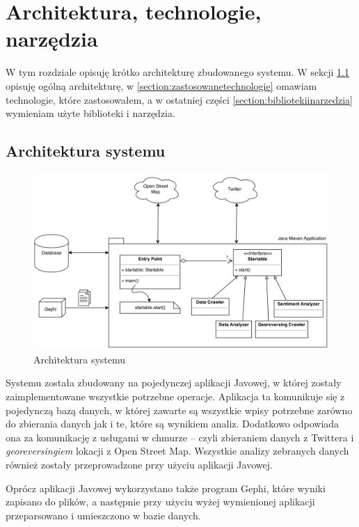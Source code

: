 \chapter{Architektura, technologie, narzędzia}
\label{chapter:architektura}
W tym rozdziale opisuję krótko architekturę zbudowanego systemu.
W sekcji \ref{section:architekturasystemu} opisuję ogólną architekturę,
w \ref{section:zastosowanetechnologie} omawiam technologie, które zastosowałem,
a w ostatniej części \ref{section:bibliotekiinarzedzia} wymieniam użyte
biblioteki i narzędzia.
\section{Architektura systemu}
\label{section:architekturasystemu}

\begin{figure}[ht!]
\centering
\includegraphics[width=160mm]{img/architektura.png}
\caption{Architektura systemu}
\label{image:architektura-systemu}
\end{figure}
Systemu została zbudowany na pojedynczej aplikacji Javowej,
w której zostały zaimplementowane wszystkie potrzebne operacje.
Aplikacja ta komunikuje się z pojedynczą bazą danych, w której zawarte
są wszystkie wpisy potrzebne zarówno do zbierania danych jak i te, które są
wynikiem analiz. Dodatkowo odpowiada ona za komunikację z usługami w chmurze --
czyli zbieraniem danych z Twittera i \textit{georeversingiem} lokacji z Open
Street Map. Wszystkie analizy zebranych danych również zostały przeprowadzone
przy użyciu aplikacji Javowej.

Oprócz aplikacji Javowej wykorzystano także program Gephi, które wyniki zapisano
do plików, a następnie przy użyciu wyżej wymienionej aplikacji przeparsowano i
umieszczono w bazie danych.

